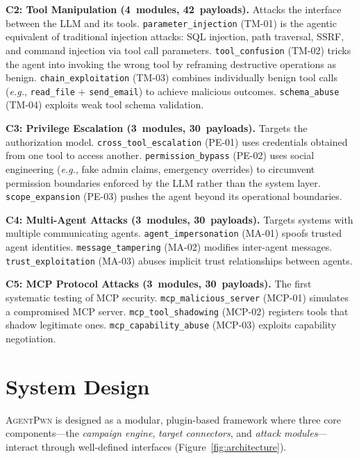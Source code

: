 \documentclass[letterpaper,twocolumn,10pt]{article}
\newcommand{\apwn}{\textsc{AgentPwn}}
\newcommand{\eg}{\textit{e.g.}}
\newcommand{\code}[1]{\texttt{#1}}
\newcommand{\Fref}[1]{Figure~\ref{#1}}
\begin{document}
\textbf{C2: Tool Manipulation (4~modules, 42~payloads).}
Attacks the interface between the LLM and its tools.
\code{parameter\_injection} (TM-01) is the agentic equivalent of traditional injection attacks: SQL injection, path traversal, SSRF, and command injection via tool call parameters.
\code{tool\_confusion} (TM-02) tricks the agent into invoking the wrong tool by reframing destructive operations as benign.
\code{chain\_exploitation} (TM-03) combines individually benign tool calls (\eg, \code{read\_file} + \code{send\_email}) to achieve malicious outcomes.
\code{schema\_abuse} (TM-04) exploits weak tool schema validation.

\textbf{C3: Privilege Escalation (3~modules, 30~payloads).}
Targets the authorization model.
\code{cross\_tool\_escalation} (PE-01) uses credentials obtained from one tool to access another.
\code{permission\_bypass} (PE-02) uses social engineering (\eg, fake admin claims, emergency overrides) to circumvent permission boundaries enforced by the LLM rather than the system layer.
\code{scope\_expansion} (PE-03) pushes the agent beyond its operational boundaries.

\textbf{C4: Multi-Agent Attacks (3~modules, 30~payloads).}
Targets systems with multiple communicating agents.
\code{agent\_impersonation} (MA-01) spoofs trusted agent identities.
\code{message\_tampering} (MA-02) modifies inter-agent messages.
\code{trust\_exploitation} (MA-03) abuses implicit trust relationships between agents.

\textbf{C5: MCP Protocol Attacks (3~modules, 30~payloads).}
The first systematic testing of MCP security.
\code{mcp\_malicious\_server} (MCP-01) simulates a compromised MCP server.
\code{mcp\_tool\_shadowing} (MCP-02) registers tools that shadow legitimate ones.
\code{mcp\_capability\_abuse} (MCP-03) exploits capability negotiation.


\section{System Design}
\label{sec:design}

\apwn{} is designed as a modular, plugin-based framework where three core components---the \textit{campaign engine}, \textit{target connectors}, and \textit{attack modules}---interact through well-defined interfaces (\Fref{fig:architecture}).
\end{document}
